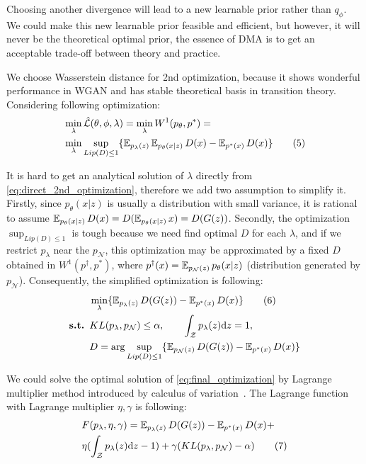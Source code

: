 Choosing another divergence will lead to a new learnable prior rather than $q_\phi$. We could make this new learnable prior feasible and efficient, but however, it will never be the theoretical optimal prior, \IE the essence of DMA is to get an acceptable trade-off between theory and practice. 

We choose Wasserstein distance for 2nd optimization, because it shows wonderful performance in WGAN and has stable theoretical basis in transition theory. Considering following optimization:
\begin{align*}\label{eq:direct_2nd_optimization}
	& \min_{\lambda} \hat{\mathcal{L}}(\theta, \phi, \lambda) = \min_{\lambda} W^1(p_\theta, p^*) = \\
	& \min_{\lambda} \sup_{Lip(D) \leq 1} \{\operatorname{\mathbb{E}}_{p_\lambda(z)} \operatorname{\mathbb{E}}_{p_\theta(x|z)} D(x)  - \operatorname{\mathbb{E}}_{p^*(x)} D(x)\} 
	\tag{5}
\end{align*}

It is hard to get an analytical solution of $\lambda$ directly from \cref{eq:direct_2nd_optimization}, therefore we add two assumption to simplify it. Firstly, since $p_\theta(x|z)$ is usually a distribution with small variance, it is rational to assume $\operatorname{\mathbb{E}}_{p_\theta(x|z)} D(x) = D(\operatorname{\mathbb{E}}_{p_\theta(x|z)} x) = D(G(z))$. Secondly, the optimization $\sup_{Lip(D) \leq 1}$ is tough because we need find optimal $D$ for each $\lambda$, and if we restrict $p_\lambda$ near the $p_\mathcal{N}$, this optimization may be approximated by a fixed $D$ obtained in $W^1(p^\dag, p^*)$, where $p^\dag(x) = \operatorname{\mathbb{E}}_{p_\mathcal{N}(z)}p_\theta(x|z)$ (distribution generated by $p_\mathcal{N}$). Consequently, the simplified optimization is following:
\begin{align*}\label{eq:final_optimization}
	& \min_{\lambda} \{\operatorname{\mathbb{E}}_{p_\lambda(z)} D(G(z))  - \operatorname{\mathbb{E}}_{p^*(x)} D(x)\} \tag{6} \\
	{\textbf{s.t. }} & KL(p_\lambda, p_\mathcal{N}) \leq \alpha, \qquad \int_{\mathcal{Z}} p_\lambda(z) \mathrm{d} z = 1, \\
	& D = \arg \sup_{Lip(D) \leq 1} \{\operatorname{\mathbb{E}}_{p_\mathcal{N}(z)} D(G(z))  - \operatorname{\mathbb{E}}_{p^*(x)} D(x)\}
\end{align*}

We could solve the optimal solution of \cref{eq:final_optimization} by Lagrange multiplier method introduced by calculus of variation~\cite{gelfand2000calculus}. The Lagrange function with Lagrange multiplier $\eta, \gamma$ is following:
\begin{align*}\label{eq:lagrange_function}
& F(p_\lambda, \eta, \gamma) = \operatorname{\mathbb{E}}_{p_\lambda(z)} D(G(z))  - \operatorname{\mathbb{E}}_{p^*(x)} D(x) + \\
& \eta (\int_{\mathcal{Z}} p_\lambda(z) \mathrm{d} z - 1) + \gamma(KL(p_\lambda, p_\mathcal{N}) - \alpha) \tag{7}
\end{align*}

